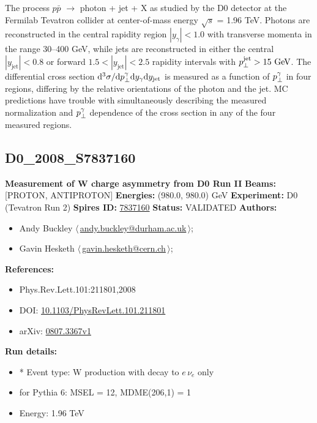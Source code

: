 \noindent The process $p \bar{p}$ \ensuremath{\to} photon + jet + X as studied by the D0 detector at the Fermilab Tevatron collider at center-of-mass energy \ensuremath{\sqrt{s}} = 1.96 TeV. Photons are reconstructed in the central rapidity region $|y_\gamma| < 1.0$ with transverse momenta in the range 30--400 GeV, while jets are reconstructed in either the central $|y_\text{jet}| < 0.8$ or forward $1.5 < |y_\text{jet}| < 2.5$ rapidity intervals with $p_\perp^\text{jet} > 15~\text{GeV}$. The differential cross section $\mathrm{d}^3 \sigma / \mathrm{d}{p_\perp^\gamma} \mathrm{d}{y_\gamma} \mathrm{d}{y_\text{jet}}$ is measured as a function of $p_\perp^\gamma$ in four regions, differing by the relative orientations of the photon and the jet.  MC predictions have trouble with simultaneously describing the measured normalization and $p_\perp^\gamma$ dependence of the cross section in any of the four measured regions.

\clearpage


\clearpage

\subsection[D0\_2008\_S7837160]{D0\_2008\_S7837160\,\cite{Abazov:2008qv}}
\textbf{Measurement of W charge asymmetry from D0 Run II}\newline
\textbf{Beams:} [PROTON, ANTIPROTON] \newline
\textbf{Energies:} (980.0, 980.0) GeV \newline
\textbf{Experiment:} D0 (Tevatron Run 2) \newline
\textbf{Spires ID:} \href{http://www.slac.stanford.edu/spires/find/hep/www?rawcmd=key+7837160}{7837160}\newline
\textbf{Status:} VALIDATED\newline
\textbf{Authors:}
\begin{itemize}
  \item Andy Buckley $\langle\,$\href{mailto:andy.buckley@durham.ac.uk}{andy.buckley@durham.ac.uk}$\,\rangle$;
  \item Gavin Hesketh $\langle\,$\href{mailto:gavin.hesketh@cern.ch}{gavin.hesketh@cern.ch}$\,\rangle$;
\end{itemize}
\textbf{References:}
\begin{itemize}
  \item Phys.Rev.Lett.101:211801,2008
  \item DOI: \href{http://dx.doi.org/10.1103/PhysRevLett.101.211801}{10.1103/PhysRevLett.101.211801}
  \item arXiv: \href{http://arxiv.org/abs/0807.3367v1}{0807.3367v1}
\end{itemize}
\textbf{Run details:}
\begin{itemize}

  \item * Event type: W production with decay to $e \, \nu_e$ only
  \item for Pythia 6: MSEL = 12, MDME(206,1) = 1
  \item Energy: 1.96 TeV\end{itemize}

